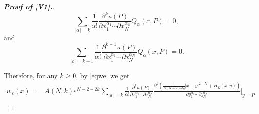 \documentclass[11pt,reqno]{article}
\numberwithin{equation}{section}
\newcommand\e\varepsilon
\begin{document}
\begin{proof}[\bf Proof of \eqref{V1}.]
\begin{equation}
					\sum_{|\alpha|=k}\frac1{\alpha!}
					\frac{\partial^ku(P)}{\partial x_1^{\alpha_1}\cdots\partial x_N^{\alpha_N}}Q_\alpha(x,P)=0,
				\end{equation}   
                and 
                \begin{equation}\label{eq1704-2}
					\sum_{|\alpha|=k+1}\frac1{\alpha!}
					\frac{\partial^{k+1}u(P)}{\partial x_1^{\alpha_1}\cdots\partial x_N^{\alpha_N}}Q_\alpha(x,P)=0.
				\end{equation}   

                     Therefore, for any $k\ge 0$,
                     by \eqref{eqwe} we get
                \begin{align*}
					\!\!\!\!\!\!\!\!\!\!\!\!\!\!\!\!\!\!\!\!\!
                    w_\e(x)=&A(N,k)\e^{N-2+2k}
					\sum_{|\alpha|=k}\frac1{\alpha!}
					\frac{\partial^ku(P)}{\partial x_1^{\alpha_1}\cdots\partial x_N^{\alpha_N}}
					\frac{\partial^k\left(\frac1{N(N-2)\omega_N}|x-y|^{2-N}+H_{\Omega}(x,y)\right)}{\partial y_1^{\alpha_1}\cdots\partial y_N^{\alpha_N}}\Bigg|_{y=P}\\

\end{align*}
\end{proof}
\end{document}
